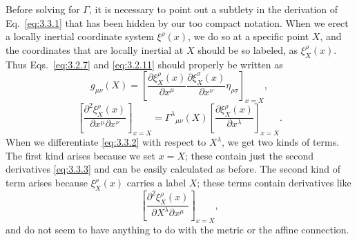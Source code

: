 Before solving for $\Gamma$, it is necessary to point out a subtlety in the
derivation of Eq.~\eqref{eq:3.3.1} that has been hidden by our too compact
notation. When we erect a locally inertial coordinate system $\xi^\rho(x)$,
we do so at a specific point $X$, and the coordinates that are locally
inertial at $X$ should be so labeled, as $\xi_X^\rho(x)$. Thus
Eqs.~\eqref{eq:3.2.7} and \eqref{eq:3.2.11} should properly be written as
\begin{equation}
  g_{\mu\nu}(X)=
  \left[
  \frac{\partial\xi_X^\rho(x)}{\partial x^\mu}
  \frac{\partial\xi_X^\sigma(x)}{\partial x^\nu}
  \eta_{\rho\sigma}\right]_{x=X},
  \tag{3.3.2}\label{eq:3.3.2}
\end{equation}
\begin{equation}
  \left[
  \frac{\partial^2\xi_X^\rho(x)}
  {\partial x^\mu\partial x^\nu}\right]_{x=X}
  =
  \Gamma^\lambda{}_{\mu\nu}(X)
  \left[\frac{\partial\xi_X^\rho(x)}
  {\partial x^\lambda}\right]_{x=X}.
  \tag{3.3.3}\label{eq:3.3.3}
\end{equation}
When we differentiate \eqref{eq:3.3.2} with respect to $X^\lambda$, we get
two kinds of terms. The first kind arises because we set $x=X$; these contain
just the second derivatives \eqref{eq:3.3.3} and can be easily calculated as
before. The second kind of term arises because $\xi_X^\rho(x)$ carries a
label $X$; these terms contain derivatives like
\begin{equation}
  \left[
  \frac{\partial^2\xi_X^\rho(x)}
  {\partial X^\lambda\partial x^\mu}\right]_{x=X},
  \tag{3.3.4}\label{eq:3.3.4}
\end{equation}
and do not seem to have anything to do with the metric or the affine
connection.

